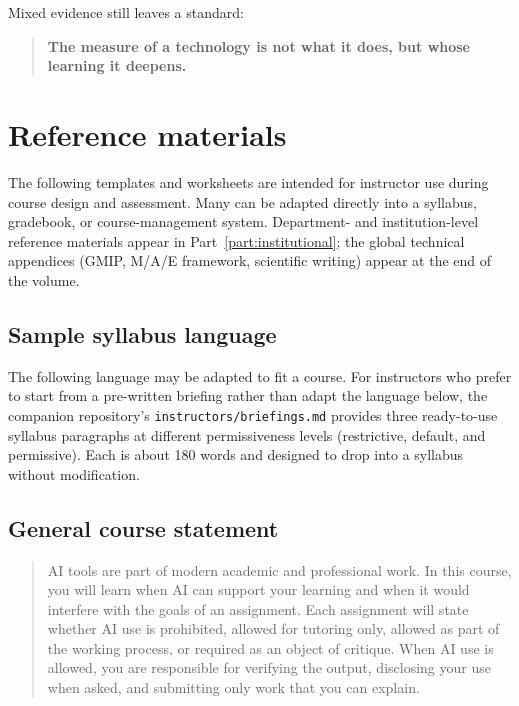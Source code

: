\documentclass{SIAMbook2023}
\begin{document}
Mixed evidence still leaves a standard:

\begin{quote}
\textbf{The measure of a technology is not what it does, but whose learning it deepens.}
\end{quote}

\section{Reference materials}
\label{i:sec:part2-refs}

The following templates and worksheets are intended for instructor use during course design and assessment. Many can be adapted directly into a syllabus, gradebook, or course-management system. Department- and institution-level reference materials appear in Part~\ref{part:institutional}; the global technical appendices (GMIP, M/A/E framework, scientific writing) appear at the end of the volume.

\subsection{Sample syllabus language}
\label{i:app:syllabus}%

The following language may be adapted to fit a course. For instructors who prefer to start from a pre-written briefing rather than adapt the language below, the companion repository's \texttt{instructors/briefings.md} provides three ready-to-use syllabus paragraphs at different permissiveness levels (restrictive, default, and permissive). Each is about 180 words and designed to drop into a syllabus without modification.

\subsection*{General course statement}

\begin{quote}
AI tools are part of modern academic and professional work. In this course, you will learn when AI can support your learning and when it would interfere with the goals of an assignment. Each assignment will state whether AI use is prohibited, allowed for tutoring only, allowed as part of the working process, or required as an object of critique. When AI use is allowed, you are responsible for verifying the output, disclosing your use when asked, and submitting only work that you can explain.
\end{quote}
\end{document}
